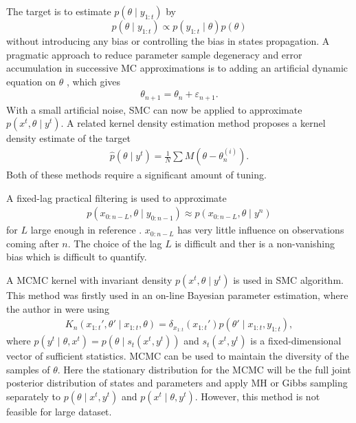 The target is to estimate $p(\theta \mid y_{1:t})$ by
\begin{equation}
p(\theta \mid y_{1:t}) \propto p(y_{1:t} \mid \theta ) p(\theta )
\end{equation}
without introducing any bias or controlling the bias in states propagation. A pragmatic approach to reduce parameter sample degeneracy and error accumulation in successive MC approximations is to adding an artificial dynamic equation on $\theta$ \cite{higuchi2001self} \cite{kitagawa1998self}, which gives
\begin{align*}
\theta_{n+1} = \theta_n+\varepsilon_{n+1}.
\end{align*}
With a small artificial noise, SMC can now be applied to approximate $p(x^t,\theta\mid y^t)$. A related kernel density estimation method proposes a kernel density estimate of the target \cite{liu2001combined} \begin{align*}
\hat{p}(\theta\mid y^t) = \frac{1}{N}\sum M(\theta-\theta_n^{(i)}). 
\end{align*} 
Both of these methods require a significant amount of tuning.

A fixed-lag practical filtering is used to approximate
\begin{align*}
p(x_{0:n-L},\theta\mid y_{0:n-1})\approx p(x_{0:n-L},\theta \mid y^n)
\end{align*}
for $L$ large enough in reference \cite{polson2008practical}. $x_{0:n-L}$ has very little influence on observations coming after $n$. The choice of the lag $L$ is difficult and ther is a non-vanishing bias which is difficult to quantify.

A MCMC kernel with invariant density $p(x^t,\theta\mid y^t)$ is used in SMC algorithm. This method was firstly used in an on-line Bayesian parameter estimation, where the author in \cite{andrieu1999sequential} were using
\begin{align*}
K_n(x_{1:t}',\theta'\mid x_{1:t},\theta) = \delta_{x_{1:t}}(x_{1:t} ')p(\theta'\mid x_{1:t},y_{1:t}),
\end{align*}
where $p(y^t\mid\theta,x^t)=p(\theta\mid s_t(x^t,y^t))$ and $s_t(x^t,y^t)$ is a fixed-dimensional vector of sufficient statistics. MCMC can be used to maintain the diversity of the samples of $\theta$. Here the stationary distribution for the MCMC will be the full joint posterior distribution of states and parameters and apply MH or Gibbs sampling separately to $p(\theta \mid x^t,y^t)$ and $p(x^t \mid \theta,y^t)$. However, this method is not feasible for large dataset. 


